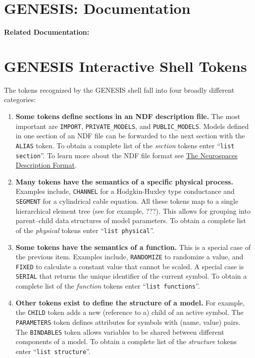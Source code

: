 \documentclass[12pt]{article}
\begin{document}
\section*{GENESIS: Documentation}

{\bf Related Documentation:}

\section*{GENESIS Interactive Shell Tokens}

The tokens recognized by the GENESIS shell fall into four broadly different categories:

\begin{enumerate}

\item {\bf Some tokens define sections in an NDF description file.} The most important are {\tt IMPORT}, {\tt PRIVATE\_MODELS}, and {\tt PUBLIC\_MODELS}. Models defined in one section of an NDF file can be forwarded to the next section with the {\tt ALIAS} token. To obtain a complete list of the {\it section} tokens enter ``{\tt list section}''. To learn more about the NDF file format see \href{../ndf-file-format/ndf-file-format.tex}{The Neurospaces Description Format}.

\item {\bf Many tokens have the semantics of a specific physical process.} Examples include, {\tt CHANNEL} for a Hodgkin-Huxley type conductance and {\tt SEGMENT} for a cylindrical cable equation. All these tokens map to a single hierarchical element tree (see for example, ???). This allows for grouping into parent--child data structures of model parameters. To obtain a complete list of the {\it physical} tokens enter ``{\tt list physical}''.

\item {\bf Some tokens have the semantics of a function.} This is a special case of the previous item. Examples include, {\tt RANDOMIZE} to randomize a value, and {\tt FIXED} to calculate a constant value that cannot be scaled. A special case is {\tt SERIAL} that returns the unique identifier  of the current symbol.  To obtain a complete list of the {\it  function} tokens enter ``{\tt list functions}''.

\item {\bf Other tokens exist to define the structure of a model.} For example, the {\tt CHILD} token adds a new (reference to a) child of an active symbol. The {\tt PARAMETERS} token defines attributes for symbols with (name, value) pairs. The {\tt BINDABLES} token allows variables to be shared between different components of a model. To obtain a complete list of the {\it structure} tokens enter ``{\tt list structure}''.

\end{enumerate}
\end{document}
